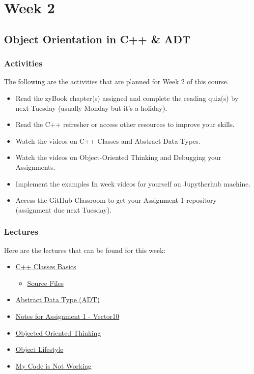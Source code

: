 \clearpage
\chapter{Week 2}

\section{Object Orientation in C++ \& ADT}
\horizontalline

\subsection{Activities}
The following are the activities that are planned for Week 2 of this course.
\begin{itemize}
    \item Read the zyBook chapter(s) assigned and complete the reading quiz(s) by next Tuesday (usually Monday but it's a holiday).
    \item Read the C++ refresher or access other resources to improve your skills.
    \item Watch the videos on C++ Classes and Abstract Data Types.
    \item Watch the videos on Object-Oriented Thinking and Debugging your Assignments.
    \item Implement the examples In week videos for yourself on Jupytherhub machine.
    \item Access the GitHub Classroom to get your Assignment-1 repository  (assignment due next Tuesday).
\end{itemize}

\subsection{Lectures}
Here are the lectures that can be found for this week:
\begin{itemize}
    \item \href{https://applied.cs.colorado.edu/mod/hvp/view.php?id=45872}{C++ Classes Basics}
    \begin{itemize}
        \item \href{https://applied.cs.colorado.edu/mod/folder/view.php?id=45873}{Source Files}
    \end{itemize}
    \item \href{https://applied.cs.colorado.edu/mod/hvp/view.php?id=45874}{Abstract Data Type (ADT)}
    \item \href{https://applied.cs.colorado.edu/mod/hvp/view.php?id=45875}{Notes for Assignment 1 - Vector10}
    \item \href{https://applied.cs.colorado.edu/mod/hvp/view.php?id=45877}{Objected Oriented Thinking}
    \item \href{https://applied.cs.colorado.edu/mod/hvp/view.php?id=45878}{Object Lifestyle}
    \item \href{https://applied.cs.colorado.edu/mod/hvp/view.php?id=45879}{My Code is Not Working}
\end{itemize}

